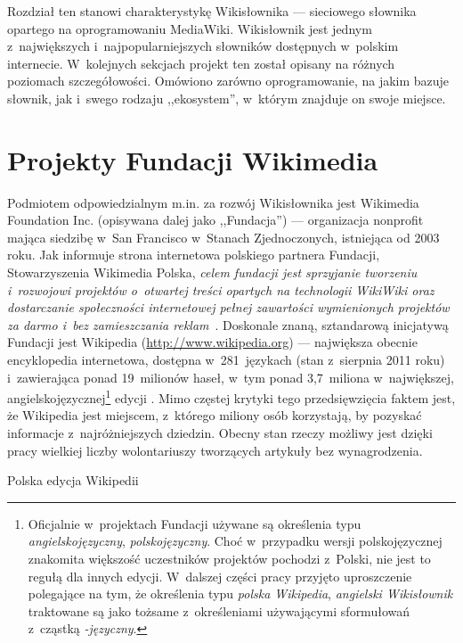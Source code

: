 \label{chap:wikt}
Rozdział ten stanowi charakterystykę Wikisłownika --- sieciowego słownika opartego na oprogramowaniu MediaWiki. Wikisłownik jest jednym z~największych i~najpopularniejszych słowników dostępnych w~polskim internecie. W~kolejnych sekcjach projekt ten został opisany na różnych poziomach szczegółowości. Omówiono zarówno oprogramowanie, na jakim bazuje słownik, jak i~swego rodzaju ,,ekosystem'', w~którym znajduje on swoje miejsce.

\section{Projekty Fundacji Wikimedia}
Podmiotem odpowiedzialnym m.in. za rozwój Wikisłownika jest Wikimedia Foundation Inc. (opisywana dalej jako ,,Fundacja'') --- organizacja non\dywiz{}profit mająca siedzibę w~San Francisco w~Stanach Zjednoczonych, istniejąca od 2003 roku. Jak informuje strona internetowa polskiego partnera Fundacji, Stowarzyszenia Wikimedia Polska, \emph{celem fundacji jest sprzyjanie tworzeniu i~rozwojowi projektów o~otwartej treści opartych na technologii WikiWiki oraz dostarczanie społeczności internetowej pełnej zawartości wymienionych projektów za darmo i~bez zamieszczania reklam}~\cite{wm:pl}. Doskonale znaną, sztandarową inicjatywą Fundacji jest Wikipedia (\url{http://www.wikipedia.org}) --- największa obecnie encyklopedia internetowa, dostępna w~281~językach (stan z~sierpnia 2011 roku) i~zawierająca ponad 19~milionów haseł, w~tym ponad 3,7~miliona w~największej, angielskojęzycznej\footnote{Oficjalnie w~projektach Fundacji używane są określenia typu \emph{angielskojęzyczny}, \emph{polskojęzyczny}. Choć w~przypadku wersji polskojęzycznej znakomita większość uczestników projektów pochodzi z~Polski, nie jest to regułą dla innych edycji. W~dalszej części pracy przyjęto uproszczenie polegające na tym, że określenia typu \emph{polska Wikipedia}, \emph{angielski Wikisłownik} traktowane są jako tożsame z~określeniami używającymi sformułowań z~cząstką \emph{-języczny}.} edycji \cite{wiki:list}. Mimo częstej krytyki tego przedsięwzięcia faktem jest, że Wikipedia jest miejscem, z~którego miliony osób korzystają, by pozyskać informacje z~najróżniejszych dziedzin. Obecny stan rzeczy możliwy jest dzięki pracy wielkiej liczby wolontariuszy tworzących artykuły bez wynagrodzenia.

\begin{illustration}
	\caption{Polska edycja Wikipedii}
\end{illustration}


